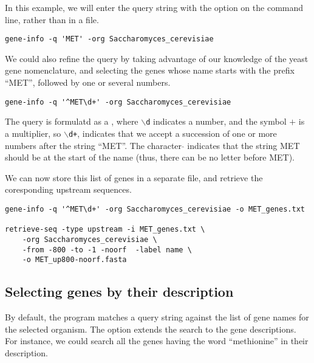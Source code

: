 In this example, we will enter the query string with the option
 on the command line, rather than in a file.

{\color{Blue} \begin{footnotesize}
\begin{verbatim}
gene-info -q 'MET' -org Saccharomyces_cerevisiae
\end{verbatim} \end{footnotesize}
}

We could also refine the query by taking advantage of our knowledge of
the yeast gene nomenclature, and selecting the genes whose name starts
with the prefix ``MET'', followed by one or several numbers.

{\color{Blue} \begin{footnotesize}
\begin{verbatim}
gene-info -q '^MET\d+' -org Saccharomyces_cerevisiae
\end{verbatim} \end{footnotesize}
}

The query is formulatd as a , where
\texttt{$\backslash$d} indicates a number, and the symbol $+$ is a
multiplier, so \texttt{$\backslash$d+}, indicates that we accept a
succession of one or more numbers after the string ``MET''. The
character $\hat{ }$ indicates that the string MET should be at the start of
the name (thus, there can be no letter before MET).

We can now store this list of genes in a separate file, and retrieve
the coresponding upstream sequences.


{\color{Blue} \begin{footnotesize}
\begin{verbatim}
gene-info -q '^MET\d+' -org Saccharomyces_cerevisiae -o MET_genes.txt

retrieve-seq -type upstream -i MET_genes.txt \
    -org Saccharomyces_cerevisiae \
    -from -800 -to -1 -noorf  -label name \
    -o MET_up800-noorf.fasta
\end{verbatim} \end{footnotesize}
}


\subsection{Selecting genes by their description}

By default, the program  matches a query string
against the list of gene names for the selected organism. The option
 extends the search to the gene descriptions. For
instance, we could search all the genes having the word ``methionine''
in their description. 

